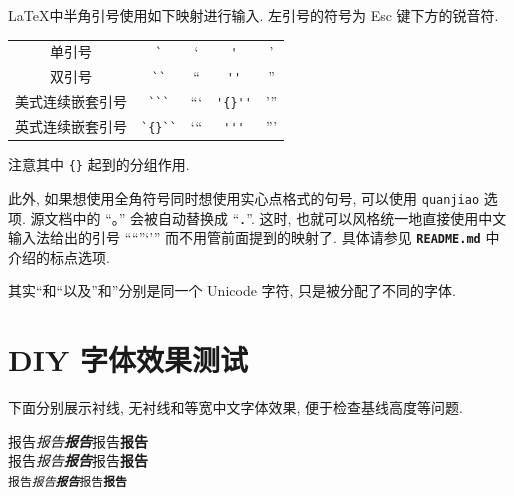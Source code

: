 \documentclass[font=default]{mpltx}
\newcommand{\note}[1]{{\color{gray}#1}}
\newcommand*\code[1]{\texttt{#1}}
\newcommand*\file[1]{\textbf{\texttt{#1}}}
\begin{document}
\LaTeX 中半角引号使用如下映射进行输入.
左引号的符号为 \textsf{Esc} 键下方的锐音符.
\begin{center}
  \begin{tabular}{c@{\quad}c@{\ $\rightarrow$\ }c@{\quad}c@{\ $\rightarrow$\ }c}
    单引号      & \verb|`|     & `     & \verb|'|     & ' \\
    双引号      & \verb|``|    & ``    & \verb|''|    & '' \\
    美式连续嵌套引号 & \verb|```|   & ```   & \verb|'{}''| & '{}'' \\
    英式连续嵌套引号 & \verb|`{}``| & `{}`` & \verb|'''|   & ''' \\
  \end{tabular}
\end{center}
注意其中 \code{\{\}} 起到的分组作用.

此外, 如果想使用全角符号同时想使用实心点格式的句号, 可以使用 \code{quanjiao} 选项.
源文档中的 ``。'' 会被自动替换成 ``．''.
这时, 也就可以风格统一地直接使用中文输入法给出的引号 ``“”‘’'' 而不用管前面提到的映射了.
具体请参见 \file{README.md} 中介绍的标点选项.

\note{其实“和``以及”和''分别是同一个 Unicode 字符, 只是被分配了不同的字体.}

\section{DIY 字体效果测试}

\newcommand{\testword}{报告}
\newcommand{\andbold}{\testword{}\textbf{\testword{}}}
\newcommand{\testline}{\testword{}\emph{\andbold{}}\andbold{}}

下面分别展示衬线, 无衬线和等宽中文字体效果, 便于检查基线高度等问题.
\begin{center}
  \textrm{\testline}\\
  \textsf{\testline}\\
  \texttt{\testline}
\end{center}
\end{document}
